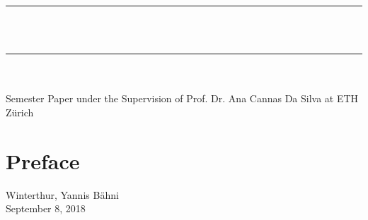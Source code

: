 



\frontmatter

\renewcommand*{\thefootnote}{\fnsymbol{footnote}}

\thispagestyle{empty}

\begin{center}
    \rule{\linewidth}{1mm}\\
	\\
	\rule{\linewidth}{1mm} \\[.5cm]
	\\
	\vspace{5cm}
	Semester Paper under the Supervision of Prof. Dr. Ana Cannas Da Silva at ETH Z\"urich
\end{center}
\clearpage

\chapter*{Preface}
\noindent Winterthur, \hfill Yannis B\"ahni\\
September 8, 2018
\tableofcontents

\mainmatter

\renewcommand*{\thefootnote}{\arabic{footnote}}




\appendix
\begin{appendix}

\end{appendix}

\printbibliography
\printindex


